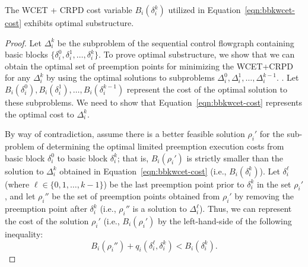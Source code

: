 \begin{theorem}
\label{thm:optimal-substructure-cost}
The WCET + CRPD cost variable $B_{i}(\delta_{i}^{k})$ utilized in Equation~\ref{eqn:bbkwcet-cost} exhibits optimal substructure.
\end{theorem}
%
\noindent
\begin{proof}
Let $\Delta_i^k$ be the subproblem of the sequential control flowgraph containing basic blocks $\{\delta_i^0, \delta_i^1, \ldots, \delta_i^{k}\}$.
To prove optimal substructure, we show that we can obtain the optimal set of preemption points for minimizing the WCET+CRPD for any $\Delta_i^k$ by using the optimal solutions to subproblems $\Delta_i^0, \Delta_i^1, \ldots, \Delta_i^{k-1}$. .  Let $B_i(\delta_i^0), B_i(\delta_i^1), \ldots, B_i(\delta_i^{k-1})$ represent the cost of the optimal solution to these subproblems.  We need to show that Equation~\ref{eqn:bbkwcet-cost} represents the optimal cost to $\Delta_i^k$.

By way of contradiction, assume there is a better feasible solution $\rho_{i}'$ for the sub-problem of determining the optimal limited preemption execution costs from basic block $\delta_{i}^{0}$ to basic block $\delta_{i}^{k}$; that is, $B_{i}(\rho_{i}')$ is strictly smaller than the solution to $\Delta_i^k$ obtained in Equation~\ref{eqn:bbkwcet-cost} (i.e.,  $B_{i}(\delta_{i}^{k})$).  Let $\delta_i^{\ell}$ (where $\ell \in \{0, 1, \ldots, k-1\}$) be the last preemption point prior to $\delta_i^k$ in the set $\rho_{i}'$, and let $\rho_{i}''$ be the set of preemption points obtained from $\rho_{i}'$ by removing the preemption point after $\delta_i^k$ (i.e., $\rho_{i}''$ is a solution to $\Delta_i^{\ell}$).  Thus, we can represent the cost of the solution $\rho_{i}'$ (i.e., $B_i(\rho_{i}')$ by the left-hand-side of the following inequality:
\begin{equation}\label{eqn:bi-deltai-lb}
    B_i(\rho_{i}'') + q_i(\delta_i^{\ell}, \delta_i^k) < B_i(\delta_i^k).
\end{equation}
  

\end{proof}
